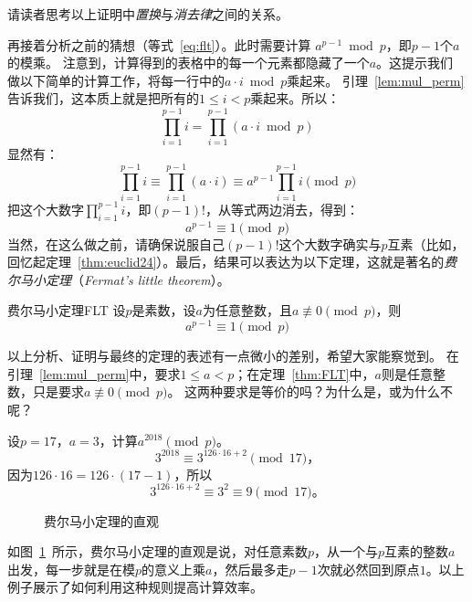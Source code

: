 \begin{thinking}
	请读者思考以上证明中\emph{置换}与\emph{消去律}之间的关系。
\end{thinking}

再接着分析之前的猜想（等式~\ref{eq:flt}）。此时需要计算 $a^{p-1} \bmod p$，即$p-1$个$a$的模乘。
注意到，计算得到的表格中的每一个元素都隐藏了一个$a$。这提示我们
做以下简单的计算工作，将每一行中的$a \cdot i \bmod p$乘起来。
引理~\ref{lem:mul_perm}告诉我们，这本质上就是把所有的$1 \leq i < p$乘起来。所以：
\[\prod_{i=1}^{p-1} i = \prod_{i=1}^{p-1} (a \cdot i \bmod p)\]
显然有：
	\[\prod_{i=1}^{p-1} i \equiv \prod_{i=1}^{p-1} (a \cdot i) \equiv a^{p-1}\prod_{i=1}^{p-1} i \pmod{p}\]
把这个大数字$\prod_{i=1}^{p-1} i$，即$(p-1)!$，从等式两边消去，得到：
	\[a^{p-1} \equiv 1 \pmod{p}\]
当然，在这么做之前，请确保说服自己$(p-1)!$这个大数字确实与$p$互素（比如，回忆起定理~\ref{thm:euclid24}）。最后，结果可以表达为以下定理，这就是著名的\emph{费尔马小定理}（\emph{Fermat's little theorem}）。

\begin{theorem}{费尔马小定理}{FLT}
    设$p$是素数，设$a$为任意整数，且$a \not \equiv 0 \pmod{p}$，则
	\[a^{p-1} \equiv 1 \pmod{p}\]
\end{theorem}

\begin{thinking}
以上分析、证明与最终的定理的表述有一点微小的差别，希望大家能察觉到。
在引理~\ref{lem:mul_perm}中，要求$1 \leq a < p$；在定理~\ref{thm:FLT}中，$a$则是任意整数，只是要求$a \not \equiv 0 \pmod{p}$。
这两种要求是等价的吗？为什么是，或为什么不呢？
\end{thinking}

\begin{example}
\label{exm:comp_flt}
	设$p = 17$，$a = 3$，计算$a^{2018} \pmod{p}$。
	\[3^{2018} \equiv 3^{126 \cdot 16 + 2 } \pmod{17}\text{，}\]
	因为$126 \cdot 16  = 126 \cdot (17 - 1)$，所以
	\[3^{126 \cdot 16 + 2 } \equiv 3^2 \equiv 9 \pmod{17}\text{。}\]
\end{example}

\begin{figure}[htbp]
	\centering
	
	\caption{费尔马小定理的直观}
	\label{fig:flt-cycle}
\end{figure}

如图~\ref{fig:flt-cycle}~所示，费尔马小定理的直观是说，对任意素数$p$，从一个与$p$互素的整数$a$出发，每一步就是在模$p$的意义上乘$a$，然后最多走$p - 1$次就必然回到原点$1$。以上例子展示了如何利用这种规则提高计算效率。

